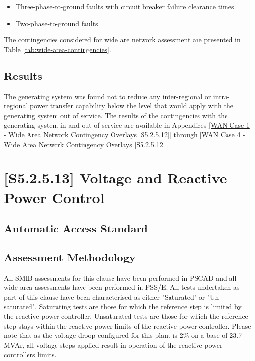 \documentclass{../grid-link-report}
\newcommand{\projectassetsdir}{../project-assets}
\begin{document}
	\begin{itemize}
		\item Three-phase-to-ground faults with circuit breaker failure clearance times
		\item Two-phase-to-ground faults
	\end{itemize}
	
	The contingencies considered for wide are network assessment are presented in Table \ref{tab:wide-area-contingencies}.
	
	\subsection{Results}
	
	
	The generating system was found not to reduce any inter-regional or intra-regional power transfer capability below the level that would apply with the generating system out of service. The results of the contingencies with the generating system in and out of service are available in Appendices \ref{WAN Case 1 - Wide Area Network Contingency Overlays [S5.2.5.12]} through \ref{WAN Case 4 - Wide Area Network Contingency Overlays [S5.2.5.12]}.
	  
	\section{[S5.2.5.13] Voltage and Reactive Power Control}
	\subsection{Automatic Access Standard}
	\begin{tcolorbox}[lightgreenbox]
		
	\end{tcolorbox}
	\subsection{Assessment Methodology}
	
	
	
	All SMIB assessments for this clause have been performed in PSCAD and all wide-area assessments have been performed in PSS/E. All tests undertaken as part of this clause have been characterised as either "Saturated" or "Un-saturated". Saturating tests are those for which the reference step is limited by the reactive power controller. Unsaturated tests are those for which the reference step stays within the reactive power limits of the reactive power controller. Please note that as the voltage droop configured for this plant is 2\% on a base of 23.7 MVAr, all voltage steps applied result in operation of the reactive power controllers limits. 
	
\end{document}
